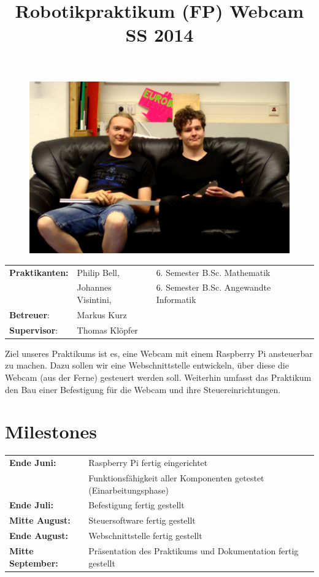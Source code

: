 \documentclass[12pt]{scrartcl}
\title{Robotikpraktikum (FP) Webcam SS 2014}
\date{\vspace{-10ex}}
\begin{document}
\maketitle

\begin{figure}[h]
	\centering
	\includegraphics[width=1\textwidth]{steckbrief.jpg}
\end{figure}

\begin{tabular}{l l l}
	\textbf{Praktikanten:}	& Philip Bell,			& 6. Semester B.Sc. Mathematik\\
							& Johannes Visintini,	& 6. Semester B.Sc. Angewandte Informatik\\
	\textbf{Betreuer}: 		& Markus Kurz 			& \\
	\textbf{Supervisor}: 	& Thomas Klöpfer		&
\end{tabular}
\vspace{1.5em}

Ziel unseres Praktikums ist es, eine Webcam mit einem Raspberry Pi ansteuerbar
zu machen. Dazu sollen wir eine Webschnittstelle entwickeln, über diese die
Webcam (aus der Ferne) gesteuert werden soll. Weiterhin umfasst das Praktikum
den Bau einer Befestigung für die Webcam und ihre Steuereinrichtungen.

\section*{Milestones}
\begin{tabular}{l l}
	\textbf{Ende Juni:}			& Raspberry Pi fertig eingerichtet\\
								& Funktionsfähigkeit aller Komponenten getestet (Einarbeitungsphase)\\
	\textbf{Ende Juli:}			& Befestigung fertig gestellt\\
	\textbf{Mitte August:}		& Steuersoftware fertig gestellt\\
	\textbf{Ende August:}		& Webschnittstelle fertig gestellt\\
	\textbf{Mitte September:}	& Präsentation des Praktikums und Dokumentation fertig gestellt
\end{tabular}
\end{document}
